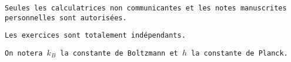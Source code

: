 \begin{tcolorbox}[
        colback=gray!20,
        colframe=gray!20,
        width=\dimexpr\textwidth\relax, 
        arc=0pt,outer arc=0pt,
        ]

\texttt{Seules les calculatrices non communicantes et les notes manuscrites personnelles sont autorisées.}

\texttt{Les exercices sont totalement indépendants.}

\texttt{On notera $k_B$ la constante de Boltzmann et $h$ la constante de Planck.}

\end{tcolorbox}